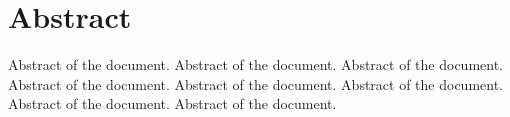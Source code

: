 \cleardoublepage

{ %
\chapter*{Abstract}

\noindent  Abstract of the document. Abstract of the document. Abstract of the document. 
Abstract of the document. Abstract of the document. Abstract of the document. 
Abstract of the document. Abstract of the document.

\lipsum[1-3]

\thispagestyle{myplain}}
